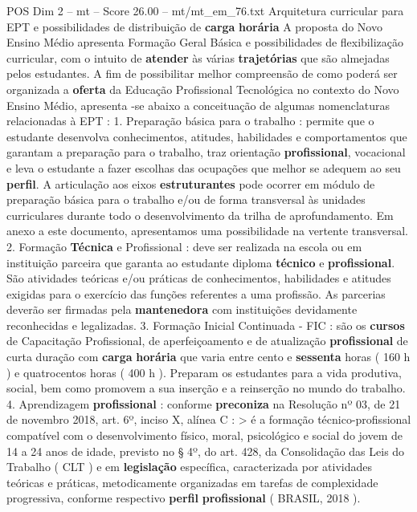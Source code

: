 \begin{textsample}{POS Dim 2 – mt – Score 26.00 – mt/mt\_em\_76.txt}  \label{ex:f2_pos_226}
Arquitetura curricular para EPT e possibilidades de distribuição de \textbf{carga} \textbf{horária} A proposta do Novo Ensino Médio apresenta Formação Geral Básica e possibilidades de flexibilização curricular, com o intuito de \textbf{atender} às várias \textbf{trajetórias} que são almejadas pelos estudantes.
A fim de possibilitar melhor compreensão de como poderá ser organizada a \textbf{oferta} da Educação Profissional Tecnológica no contexto do Novo Ensino Médio, apresenta -se abaixo a conceituação de algumas nomenclaturas relacionadas à EPT : 1.
Preparação básica para o trabalho : permite que o estudante desenvolva conhecimentos, atitudes, habilidades e comportamentos que garantam a preparação para o trabalho, traz orientação \textbf{profissional}, vocacional e leva o estudante a fazer escolhas das ocupações que melhor se adequem ao seu \textbf{perfil}.
A articulação aos eixos \textbf{estruturantes} pode ocorrer em módulo de preparação básica para o trabalho e/ou de forma transversal às unidades curriculares durante todo o desenvolvimento da trilha de aprofundamento.
Em anexo a este documento, apresentamos uma possibilidade na vertente transversal. 2.
Formação \textbf{Técnica} e Profissional : deve ser realizada na escola ou em instituição parceira que garanta ao estudante diploma \textbf{técnico} e \textbf{profissional}.
São atividades teóricas e/ou práticas de conhecimentos, habilidades e atitudes exigidas para o exercício das funções referentes a uma profissão.
As parcerias deverão ser firmadas pela \textbf{mantenedora} com instituições devidamente reconhecidas e legalizadas. 3.
Formação Inicial Continuada - FIC : são os \textbf{cursos} de Capacitação Profissional, de aperfeiçoamento e de atualização \textbf{profissional} de curta duração com \textbf{carga} \textbf{horária} que varia entre cento e \textbf{sessenta} horas ( 160 h ) e quatrocentos horas ( 400 h ).
Preparam os estudantes para a vida produtiva, social, bem como promovem a sua inserção e a reinserção no mundo do trabalho. 4.
Aprendizagem \textbf{profissional} : conforme \textbf{preconiza} na Resolução nº 03, de 21 de novembro 2018, art. 6º, inciso X, alínea C : > é a formação técnico-profissional compatível com o desenvolvimento físico, moral, psicológico e social do jovem de 14 a 24 anos de idade, previsto no § 4º, do art. 428, da Consolidação das Leis do Trabalho ( CLT ) e em \textbf{legislação} específica, caracterizada por atividades teóricas e práticas, metodicamente organizadas em tarefas de complexidade progressiva, conforme respectivo \textbf{perfil} \textbf{profissional} ( BRASIL, 2018 ).

\end{textsample}
